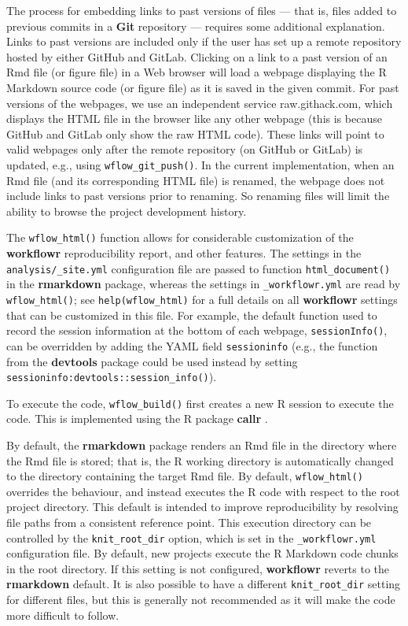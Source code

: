 \documentclass[9pt,a4paper]{extarticle}
\begin{document}
The process for embedding links to past versions of files --- that is,
files added to previous commits in a \textbf{Git} repository --- requires some
additional explanation. Links to past versions are included only if the
user has set up a remote repository hosted by either GitHub and GitLab.
Clicking on a link to a past version of an Rmd file (or figure file) in
a Web browser will load a webpage displaying the R Markdown source code
(or figure file) as it is saved in the given commit. For past versions
of the webpages, we use an independent service raw.githack.com, which
displays the HTML file in the browser like any other webpage (this is
because GitHub and GitLab only show the raw HTML code). These links will
point to valid webpages only after the remote repository (on GitHub or
GitLab) is updated, e.g., using \texttt{wflow\_git\_push()}. In the current
implementation, when an Rmd file (and its corresponding HTML file) is
renamed, the webpage does not include links to past versions prior to
renaming. So renaming files will limit the ability to browse the project
development history.

The \texttt{wflow\_html()} function allows for considerable customization of the
 \textbf{workflowr} reproducibility report, and other features. The settings in
the \verb|analysis/_site.yml| configuration file are passed to function
\texttt{html\_document()} in the \textbf{rmarkdown} package, whereas the settings in
\verb|_workflowr.yml| are read by \texttt{wflow\_html()}; see
\texttt{help(wflow\_html)} for a full details on all \textbf{workflowr} settings
that can be customized in this file. For example, the default function
used to record the session information at the bottom of each webpage,
\texttt{sessionInfo()}, can be overridden by adding the YAML field
\verb|sessioninfo| (e.g., the function from the \textbf{devtools} \cite{devtools}
package could be used instead by setting
\texttt{sessioninfo:\;devtools::session\_info()}).

To execute the code, \texttt{wflow\_build()} first creates a new R session to
execute the code. This is implemented using the R package \textbf{callr}
\cite{callr}.

By default, the \textbf{rmarkdown} package renders an Rmd file in the directory
where the Rmd file is stored; that is, the R working directory is
automatically changed to the directory containing the target Rmd file.
By default, \texttt{wflow\_html()} overrides the behaviour, and instead executes
the R code with respect to the root project directory. This default is
intended to improve reproducibility by resolving file paths from a
consistent reference point. This execution directory can be controlled
by the \verb|knit_root_dir| option, which is set in the 
\texttt{\_workflowr.yml} configuration file. By default, new projects execute the
R Markdown code chunks in the root directory. If this setting is not
configured, \textbf{workflowr} reverts to the \textbf{rmarkdown} default. It is also
possible to have a different \texttt{knit\_root\_dir} setting for
different files, but this is generally not recommended as it will make
the code more difficult to follow.
\end{document}
